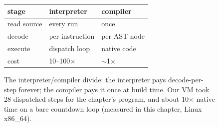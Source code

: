 \begin{figure}[htbp]
\centering
\begin{tabular}{lll}
\toprule
stage & interpreter & compiler \\
\midrule
read source & every run & once \\
decode & per instruction & per AST node \\
execute & dispatch loop & native code \\
cost & 10--100$\times$ & $\sim$1$\times$ \\
\bottomrule
\end{tabular}
\caption{The interpreter/compiler divide: the interpreter pays
decode-per-step forever; the compiler pays it once at build time.
Our VM took 28 dispatched steps for the chapter's program, and about 10$\times$ native time on a bare countdown loop (measured in this chapter, Linux x86\_64).}
\label{fig:loop18}
\end{figure}
